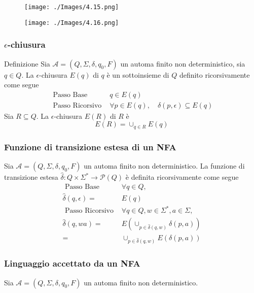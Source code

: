 \begin{figure}[hbpt!]
    \centering
    \texttt{[image: ./Images/4.15.png]}
\end{figure}
\FloatBarrier

\begin{figure}[hbpt!]
    \centering
    \texttt{[image: ./Images/4.16.png]}
\end{figure}
\FloatBarrier

\subsubsection{$\epsilon$-chiusura}
Definizione
Sia $\mathcal{A}=\left(Q, \Sigma, \delta, q_{0}, F\right)$ un automa finito non deterministico, sia $q \in Q .$ La $\epsilon$-chiusura $E(q)$ di $q$ è un sottoinsieme di $Q$ definito ricorsivamente come segue
$$
\begin{aligned}
\text { Passo Base } & q \in E(q) \\
\text { Passo Ricorsivo } & \forall p \in E(q), \quad \delta(p, \epsilon) \subseteq E(q)
\end{aligned}
$$
Sia $R \subseteq Q$. La $\epsilon$-chiusura $E(R)$ di $R$ è
$$
E(R)=\cup_{q \in R} E(q)
$$

\subsubsection{Funzione di transizione estesa di un NFA}

Sia $\mathcal{A}=\left(Q, \Sigma, \delta, q_{0}, F\right)$ un automa finito non deterministico. La funzione di transizione estesa $\hat{\delta}: Q \times \Sigma^{*} \rightarrow \mathcal{P}(Q)$ è definita ricorsivamente come segue
$$
\begin{aligned}
\text { Passo Base } & \forall q \in Q, \\
\hat{\delta}(q, \epsilon)=& E(q) \\
\text { Passo Ricorsivo } & \forall q \in Q, w \in \Sigma^{*}, a \in \Sigma, \\
\hat{\delta}(q, w a)=& E\left(\cup_{p \in \hat{\delta}(q, w)} \delta(p, a)\right) \\
=& \cup_{p \in \hat{\delta}(q, w)} E(\delta(p, a))
\end{aligned}
$$

\subsubsection{Linguaggio accettato da un NFA}
Sia $\mathcal{A}=\left(Q, \Sigma, \delta, q_{0}, F\right)$ un automa finito non deterministico. 

